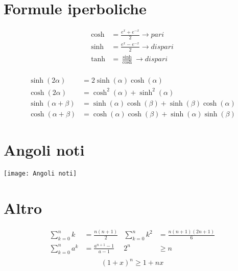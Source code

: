 \section{Formule iperboliche}
\begin{minipage}[t]{0.35\textwidth}
	\begin{align*}
		\cosh &=  \frac{e^{x} + e^{-x}}{2} \rightarrow pari\\
		\sinh &=  \frac{e^{x} - e^{-x}}{2} \rightarrow dispari\\
		\tanh &=  \frac{\sinh}{\cosh} \rightarrow dispari\\
	\end{align*}
\end{minipage}
%
\begin{minipage}[t]{0.65\textwidth}
\begin{align*}
	\sinh \left( 2 \alpha  \right) &=  2\sinh \left( \alpha  \right) \cosh \left( \alpha  \right)  \\
	\cosh \left( 2 \alpha  \right)  &= \cosh ^2 \left( \alpha  \right)  + \sinh ^2 \left( \alpha  \right) \\
	\sinh \left( \alpha + \beta  \right) &=  \sinh \left( \alpha  \right) \cosh \left( \beta  \right) + \sinh \left( \beta  \right) \cosh \left( \alpha  \right) \\
	\cosh \left( \alpha  + \beta  \right)  &=  \cosh \left( \alpha  \right)  \cosh \left( \beta  \right) + \sinh\left( \alpha  \right) \sinh\left( \beta  \right)      
\end{align*}
\end{minipage}
\begin{minipage}[t]{0.48\textwidth}
\section{Angoli noti}
\begin{center}
  \texttt{[image: Angoli noti]}
\end{center}
\end{minipage}
%
\begin{minipage}[t]{0.48\textwidth}
\section{Altro}
\begin{align*}
	\sum_{k=0}^{n} k &=  \frac{n\left( n+1 \right) }{2} & \sum_{k=0}^{n} k^2 &= \frac{n\left( n+1 \right) \left( 2n+1 \right) }{6} \\
	\sum_{k=0}^{n} a^{k} &=  \frac{a^{n+1}-1}{a-1} & 2^{n} &\ge n\\
\end{align*}
\[
	\left( 1+x \right) ^{n} \ge 1 + nx
\] 
\end{minipage}


